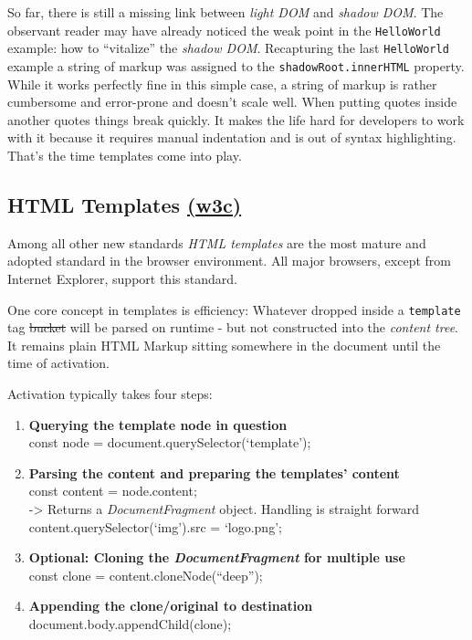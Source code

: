 \documentclass[]{article}
\providecommand{\tightlist}{%
  \setlength{\itemsep}{0pt}\setlength{\parskip}{0pt}}
\begin{document}
So far, there is still a missing link between \emph{light DOM} and
\emph{shadow DOM}. The observant reader may have already noticed the
weak point in the \texttt{HelloWorld} example: how to ``vitalize'' the
\emph{shadow DOM}. Recapturing the last \texttt{HelloWorld} example a
string of markup was assigned to the \texttt{shadowRoot.innerHTML}
property. While it works perfectly fine in this simple case, a string of
markup is rather cumbersome and error-prone and doesn't scale well. When
putting quotes inside another quotes things break quickly. It makes the
life hard for developers to work with it because it requires manual
indentation and is out of syntax highlighting. That's the time templates
come into play.

\subsection{\texorpdfstring{HTML Templates
\href{https://www.w3.org/TR/html5/scripting-1.html\#the-template-element}{(w3c)}}{HTML Templates (w3c)}}\label{html-templates-w3c}

Among all other new standards \emph{HTML templates} are the most mature
and adopted standard in the browser environment. All major browsers,
except from Internet Explorer, support this standard.

One core concept in templates is efficiency: Whatever dropped inside a
\texttt{template} tag \sout{bucket} will be parsed on runtime - but not
constructed into the \emph{content tree}. It remains plain HTML Markup
sitting somewhere in the document until the time of activation.

Activation typically takes four steps:

\begin{enumerate}
\def\labelenumi{\arabic{enumi}.}
\tightlist
\item
  \textbf{Querying the template node in question}\\
  const node = document.querySelector(`template');
\item
  \textbf{Parsing the content and preparing the templates' content}\\
  const content = node.content;\\
  -\textgreater{} Returns a \emph{DocumentFragment} object. Handling is
  straight forward content.querySelector(`img').src = `logo.png';
\item
  \textbf{Optional: Cloning the \emph{DocumentFragment} for multiple
  use}\\
  const clone = content.cloneNode(``deep'');
\item
  \textbf{Appending the clone/original to destination}\\
  document.body.appendChild(clone);
\end{enumerate}
\end{document}
